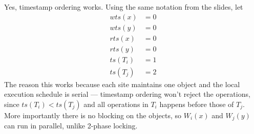 Yes, timestamp ordering works.
Using the same notation from the slides, let
\begin{align*}
wts(x) &= 0 \\
wts(y) &= 0 \\
rts(x) &= 0 \\
rts(y) &= 0 \\
ts(T_i) &= 1 \\
ts(T_j) &= 2
\end{align*}
The reason this works because each site maintains one object and the local execution schedule is serial --- timestamp ordering won't reject the operations, since $ts(T_i) < ts(T_j)$ and all operations in $T_i$ happens before those of $T_j$.
More importantly there is no blocking on the objects, so $W_i(x)$ and $W_j(y)$ can run in parallel, unlike 2-phase locking.
